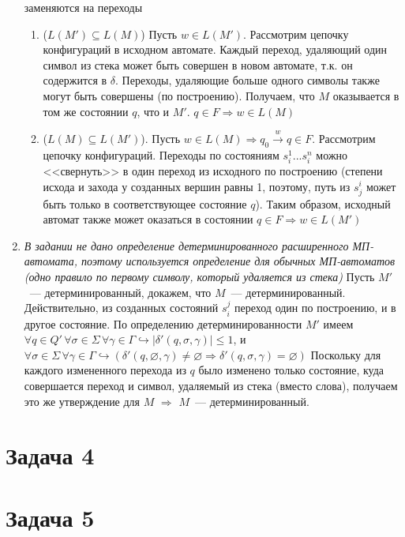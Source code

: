 \documentclass[a4paper]{article}
\begin{document}
\begin{enumerate}
заменяются на переходы
\begin{center}
\end{center}
\begin{enumerate}[1.]
\item ($L(M')\subseteq L(M)$) Пусть $w\in L(M')$. Рассмотрим цепочку конфигураций в исходном автомате. Каждый переход, удаляющий один символ из стека может быть совершен в новом автомате, т.к. он содержится в $\delta$. Переходы, удаляющие больше одного символы также могут быть совершены (по построению). Получаем, что $M$ оказывается в том же состоянии $q$, что и $M'$. $q\in F\Rightarrow w\in L(M)$
\item ($L(M)\subseteq L(M')$). Пусть $w\in L(M)\Rightarrow q_0\overset{w}{\longrightarrow}q\in F$. Рассмотрим цепочку конфигураций. Переходы по состояниям $s_i^1...s_i^n$ можно <<свернуть>> в один переход из исходного по построению (степени исхода и захода у созданных вершин равны 1, поэтому, путь из $s^i_j$ может быть только в соответствующее состояние $q$). Таким образом, исходный автомат также может оказаться в состоянии $q\in F\Rightarrow w\in L(M')$
\end{enumerate}
\item {\em{В задании не дано определение детерминированного расширенного МП-автомата, поэтому используется определение для обычных МП-автоматов (одно правило по первому символу, который удаляется из стека)}}\newline
Пусть $M'$~--- детерминированный, докажем, что $M$~--- детерминированный. Действительно, из созданных состояний $s_i^j$ переход один по построению, и в другое состояние.\newline
По определению детерминированности $M'$ имеем\newline
$\forall q\in Q'\,\forall\sigma\in\Sigma\,\forall\gamma\in\Gamma\hookrightarrow|\delta'(q,\sigma,\gamma)|\leqslant 1$, и\newline $\forall\sigma\in\Sigma\,\forall\gamma\in\Gamma\hookrightarrow(\delta'(q,\varnothing,\gamma)\neq\varnothing\Rightarrow\delta'(q,\sigma,\gamma)=\varnothing)$
Поскольку для каждого измененного перехода из $q$ было изменено только состояние, куда совершается переход и символ, удаляемый из стека (вместо слова), получаем это же утверждение для $M$ $\Rightarrow$ $M$~--- детерминированный.
\end{enumerate}
\section*{Задача 4}
\section*{Задача 5}
\end{document}
